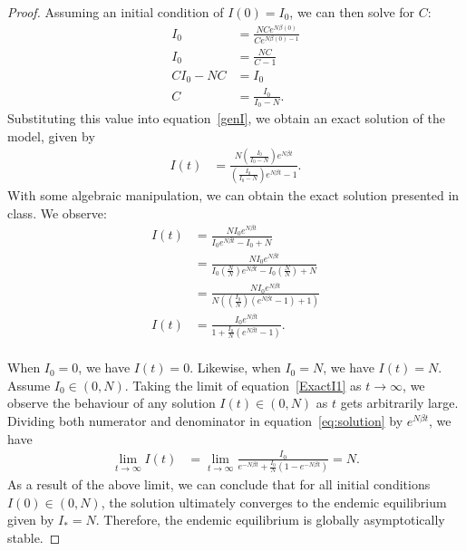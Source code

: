 \documentclass[12pt]{article}
\begin{document}
\begin{enumerate}[(a)]
\begin{enumerate}[(i)]
{\begin{proof}
Assuming an initial condition of $I(0) = I_0$, we can then solve for $C$:
\begin{equation*}
\begin{aligned}
I_0 &= \frac{NCe^{N\beta(0)}}{Ce^{N\beta(0)-1}} \\
I_0 &= \frac{NC}{C-1} \\
C I_0 - NC &= I_0 \\
C &= \frac{I_0}{I_0 - N}.
\end{aligned}
\end{equation*}
Substituting this value into equation~\eqref{genI}, we obtain an exact solution of the model, given by
\begin{equation}
\begin{aligned}
I(t) &= \frac{N \left(\frac{I_0}{I_0 - N}\right) e^{N \beta t}}{\left(\frac{I_0}{I_0 - N}\right) e^{N \beta t} - 1}.
\label{ExactI1}
\end{aligned}
\end{equation}
With some algebraic manipulation, we can obtain the exact solution presented in class. We observe:
\begin{equation} \label{eq:solution}
\begin{aligned}
I(t) &= \frac{N I_0 e^{N \beta t}}{I_0 e^{N \beta t} - I_0 + N} \\
&= \frac{N I_0 e^{N \beta t}}{I_0 \left(\frac{N}{N}\right) e^{N \beta t} - I_0 \left(\frac{N}{N}\right) + N} \\
&= \frac{N I_0 e^{N \beta t}}{N\left(\left(\frac{I_0}{N}\right)(e^{N\beta t} - 1) + 1\right)} \\
I(t) &= \frac{I_0 e^{N \beta t}}{1 + \frac{I_0}{N}(e^{N \beta t} - 1)}.
\end{aligned}
\end{equation}
\\

When $I_0 = 0$, we have $I(t) = 0$. Likewise, when $I_0 = N$, we have $I(t) = N$. Assume $I_0 \in (0, N)$.
Taking the limit of equation~\eqref{ExactI1} as $t \to \infty$, we observe the behaviour of any solution $I(t) \in (0,N)$ as $t$ gets arbitrarily large. Dividing both numerator and denominator in equation~\eqref{eq:solution} by $e^{N \beta t}$, we have
\begin{equation*}
\begin{aligned}
\lim_{t \to \infty} I(t) &= \lim_{t \to \infty}  \frac{I_0}{ e^{-N \beta t} + \frac{I_0}{N}(1 -  e^{-N \beta t})} = N.
\end{aligned}
\end{equation*}
As a result of the above limit, we can conclude that for all initial conditions $I(0) \in (0,N)$, the solution ultimately converges to the endemic equilibrium given by $I_\ast = N$.
Therefore, the endemic equilibrium is globally asymptotically stable.
      \end{proof}
    }
    

\end{enumerate}
\end{enumerate}
\end{document}

